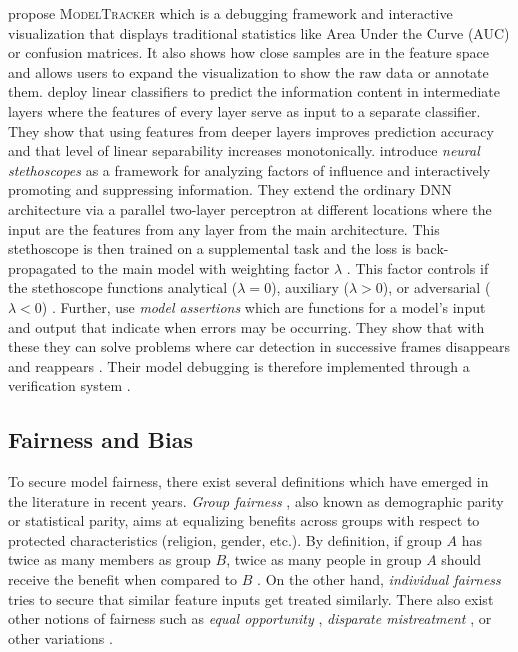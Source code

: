 \citet{amershi2015modeltracker} propose \textsc{ModelTracker} which is a debugging framework and interactive visualization that displays traditional statistics like Area Under the Curve (AUC) or confusion matrices. It also shows how close samples are in the feature space and allows users to expand the visualization to show the raw data or annotate them. \citet{AlainB17} deploy linear classifiers to predict the information content in intermediate layers where the features of every layer serve as input to a separate classifier. They show that using features from deeper layers improves prediction accuracy and  that level of linear separability increases monotonically. \citet{fuchs2018scrutinizing} introduce \emph{neural stethoscopes} as a framework for analyzing factors of influence and interactively promoting and suppressing information. They extend the ordinary DNN architecture via a parallel two-layer perceptron at different locations where the input are the features from any layer from the main architecture. This stethoscope is then trained on a supplemental task and the loss is back-propagated to the main model with weighting factor $\lambda$ \citep{fuchs2018scrutinizing}. This factor controls if the stethoscope functions analytical ($\lambda = 0$), auxiliary ($\lambda > 0$), or adversarial ($\lambda < 0$) \citep{fuchs2018scrutinizing}. Further, \citet{KangRBZ20} use \emph{model assertions} which are functions for a model's input and output that indicate when errors may be occurring. They show that with these they can solve problems where car detection in successive frames disappears and reappears \citep{KangRBZ20}. Their model debugging is therefore implemented through a verification system \citep{xie2020explainable}. 




\subsection{Fairness and Bias}
To secure model fairness, there exist several definitions which have emerged in the literature in recent years. \emph{Group fairness} \citep{CaldersKP09}, also known as  demographic parity or statistical parity, aims at equalizing benefits across groups with respect to protected characteristics (\eg religion, gender, etc.). By definition, if group $A$ has twice as many members as group $B$, twice as many people in group $A$ should receive the benefit when compared to $B$ \citep{xie2020explainable}. On the other hand, \emph{individual fairness} \citep{DworkHPRZ12} tries to secure that similar feature inputs get treated similarly. There also exist other notions of fairness such as \emph{equal opportunity} \citep{HardtPNS16}, \emph{disparate mistreatment} \citep{ZafarVGG17}, or other variations \citep{HeidariFGK18, WoodworthGOS17}.

